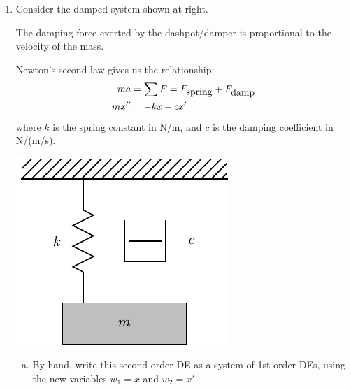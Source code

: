 \begin{enumerate}
\begin{Solution}
\begin{enumerate}[(a)]
  \end{enumerate}
\end{Solution}


\item 
  \begin{Question}
    \begin{minipage}[t]{0.6\linewidth}
      \vspace{0pt} Consider the damped system shown at right.

      The damping force exerted by the dashpot/damper is proportional
      to the velocity of the mass.

Newton's second law gives us the relationship:
\begin{align*}
ma & = \sum F = F_{\mbox{spring}} + F_{\mbox{damp}} \\
m x'' & = -k x  - c x' 
\end{align*}
where $k$ is the spring constant in N/m, and $c$ is the damping
coefficient in N/(m/s).

    \end{minipage}
    \begin{minipage}[t]{0.3\linewidth}
\vspace{0pt}
\begin{center}
\includegraphics[width=0.9\linewidth]{graphics/Week08_Spring/W08DampedSpringNoFext}
\end{center}
    \end{minipage}

\begin{enumerate}[(a)]
\item By hand, write this second order DE as a system of 1st order
  DEs, using the new variables $w_1 = x$ and $w_2 = x'$


\end{enumerate}
\end{Question}
\end{enumerate}

